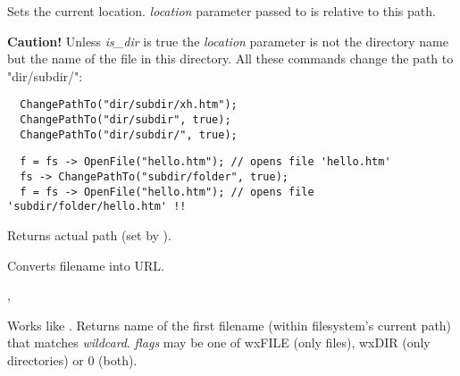 Sets the current location. {\it location} parameter passed to 
 is relative to this path.

{\bf Caution! } Unless {\it is\_dir} is true the {\it location} parameter
is not the directory name but the name of the file in this directory. All these
commands change the path to "dir/subdir/":

\begin{verbatim}
  ChangePathTo("dir/subdir/xh.htm");
  ChangePathTo("dir/subdir", true);
  ChangePathTo("dir/subdir/", true);
\end{verbatim}





\begin{verbatim}
  f = fs -> OpenFile("hello.htm"); // opens file 'hello.htm'
  fs -> ChangePathTo("subdir/folder", true);
  f = fs -> OpenFile("hello.htm"); // opens file 'subdir/folder/hello.htm' !!
\end{verbatim}

\label{wxfilesystemgetpath}


Returns actual path (set by ).

\label{wxfilesystemfilenametourl}


Converts filename into URL.


,

\label{wxfilesystemfindfirst}


Works like . Returns name of the first
filename (within filesystem's current path) that matches {\it wildcard}. {\it flags} may be one of
wxFILE (only files), wxDIR (only directories) or 0 (both).

